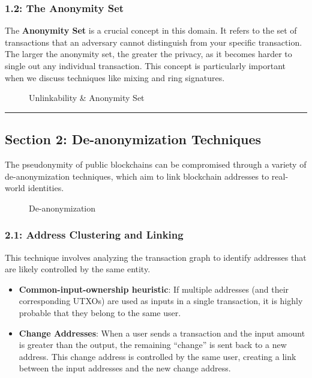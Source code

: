 \subsubsection{1.2: The Anonymity Set}\label{the-anonymity-set}

The \textbf{Anonymity Set} is a crucial concept in this domain. It
refers to the set of transactions that an adversary cannot distinguish
from your specific transaction. The larger the anonymity set, the
greater the privacy, as it becomes harder to single out any individual
transaction. This concept is particularly important when we discuss
techniques like mixing and ring signatures.

\begin{figure}
\centering
\caption{Unlinkability \& Anonymity Set}
\end{figure}

\begin{center}\rule{0.5\linewidth}{0.5pt}\end{center}

\subsection{Section 2: De-anonymization
Techniques}\label{section-2-de-anonymization-techniques}

The pseudonymity of public blockchains can be compromised through a
variety of de-anonymization techniques, which aim to link blockchain
addresses to real-world identities.

\begin{figure}
\centering
\caption{De-anonymization}
\end{figure}

\subsubsection{2.1: Address Clustering and
Linking}\label{address-clustering-and-linking}

This technique involves analyzing the transaction graph to identify
addresses that are likely controlled by the same entity.

\begin{itemize}
\tightlist
\item
  \textbf{Common-input-ownership heuristic}: If multiple addresses (and
  their corresponding UTXOs) are used as inputs in a single transaction,
  it is highly probable that they belong to the same user.
\item
  \textbf{Change Addresses}: When a user sends a transaction and the
  input amount is greater than the output, the remaining ``change'' is
  sent back to a new address. This change address is controlled by the
  same user, creating a link between the input addresses and the new
  change address.
\end{itemize}

